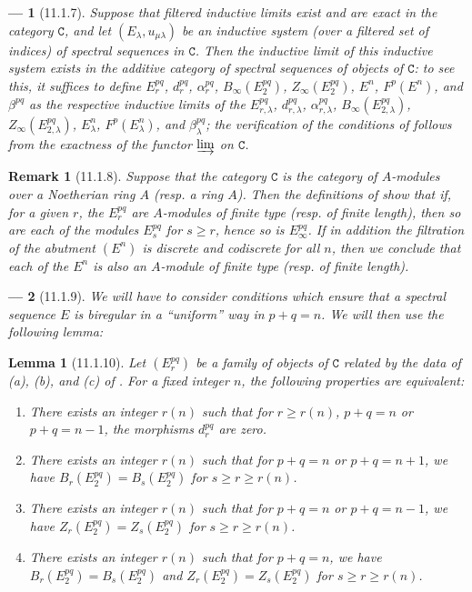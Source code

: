 \documentclass[oneside]{amsart}
\theoremstyle{ega-env-style}
\newtheorem*{env}{---}
\theoremstyle{ega-thm-env-style}
\newtheorem*{lemma}{Lemma}
\theoremstyle{ega-defn-env-style}
\newtheorem*{remark}{Remark}
\def\cat{\mathtt}                   %
\def\geq{\geqslant}                 %
\let\EGAOriginalLabel\label
\renewcommand{\label}[1]{\phantomsection\EGAOriginalLabel{#1}}
\begin{document}
\begin{env}[11.1.7]
\label{0.11.1.7}
Suppose that filtered inductive limits exist and are exact in the category $\cat{C}$, and let $(E_\lambda,u_{\mu\lambda})$ be an inductive system (over a filtered set of indices) of spectral sequences in $\cat{C}$.
Then the \emph{inductive limit} of this inductive system exists in the additive category of spectral sequences of objects of $\cat{C}$: to see this, it suffices to define $E_r^{pq}$, $d_r^{pq}$, $\alpha_r^{pq}$, $B_\infty(E_2^{pq})$, $Z_\infty(E_2^{pq})$, $E^n$, $F^p(E^n)$, and $\beta^{pq}$ as the respective inductive limits of the $E_{r,\lambda}^{pq}$, $d_{r,\lambda}^{pq}$, $\alpha_{r,\lambda}^{pq}$, $B_\infty(E_{2,\lambda}^{pq})$, $Z_\infty(E_{2,\lambda}^{pq})$, $E_\lambda^n$, $F^p(E_\lambda^n)$, and $\beta_\lambda^{pq}$; the verification of the conditions of  follows from the exactness of the functor $\varinjlim$ on $\cat{C}$.
\end{env}

\begin{remark}[11.1.8]
\label{0.11.1.8}
Suppose that the category $\cat{C}$ is the category of $A$-modules over a \emph{Noetherian} ring $A$ (resp. a ring $A$).
Then the definitions of  show that if, for a given $r$, the $E_r^{pq}$ are $A$-modules \emph{of finite type} (resp. \emph{of finite length}), then so are each of the modules $E_s^{pq}$ for $s\geq r$, hence so is $E_\infty^{pq}$.
If in addition the filtration of the abutment $(E^n)$ is \emph{discrete} and \emph{codiscrete} for all $n$, then we conclude that each of the $E^n$ is also an $A$-module \emph{of finite type} (resp. \emph{of finite length}).
\end{remark}

\begin{env}[11.1.9]
\label{0.11.1.9}
We will have to consider conditions which ensure that a spectral sequence $E$ is biregular in a ``uniform'' way in $p+q=n$.
We will then use the following lemma:
\end{env}

\begin{lemma}[11.1.10]
\label{0.11.1.10}
Let $(E_r^{pq})$ be a family of objects of $\cat{C}$ related by the data of \emph{(a)}, \emph{(b)}, and \emph{(c)} of .
For a fixed integer $n$, the following properties are equivalent:
\begin{enumerate}
  \item[{\rm(a)}] There exists an integer $r(n)$ such that for $r\geq r(n)$, $p+q=n$ or $p+q=n-1$, the morphisms $d_r^{pq}$ are zero.
  \item[{\rm(b)}] There exists an integer $r(n)$ such that for $p+q=n$ or $p+q=n+1$, we have $B_r(E_2^{pq})=B_s(E_2^{pq})$ for $s\geq r\geq r(n)$.
  \item[{\rm(c)}] There exists an integer $r(n)$ such that for $p+q=n$ or $p+q=n-1$, we have $Z_r(E_2^{pq})=Z_s(E_2^{pq})$ for $s\geq r\geq r(n)$.
  \item[{\rm(d)}] There exists an integer $r(n)$ such that for $p+q=n$, we have $B_r(E_2^{pq})=B_s(E_2^{pq})$ and $Z_r(E_2^{pq})=Z_s(E_2^{pq})$ for $s\geq r\geq r(n)$.
\end{enumerate}
\end{lemma}
\end{document}
